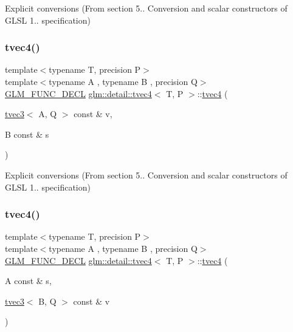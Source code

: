 Explicit conversions (From section 5.. Conversion and scalar constructors of G\+L\+SL 1.. specification) 

\mbox{\label{structglm_1_1detail_1_1tvec4_a3cfd3a19a14623991a562e5834cc6d1f}} 
\subsubsection{\texorpdfstring{tvec4()}{tvec4()}\hspace{0.1cm}{\footnotesize\ttfamily [11/23]}}
{\footnotesize\ttfamily template$<$typename T, precision P$>$ \\
template$<$typename A , typename B , precision Q$>$ \\
\hyperlink{setup_8hpp_ab2d052de21a70539923e9bcbf6e83a51}{G\+L\+M\+\_\+\+F\+U\+N\+C\+\_\+\+D\+E\+CL} \hyperlink{structglm_1_1detail_1_1tvec4}{glm\+::detail\+::tvec4}$<$ T, P $>$\+::\hyperlink{structglm_1_1detail_1_1tvec4}{tvec4} (\begin{DoxyParamCaption}\item[{\hyperlink{structglm_1_1detail_1_1tvec3}{tvec3}$<$ A, Q $>$ const \&}]{v,  }\item[{B const \&}]{s }\end{DoxyParamCaption})\hspace{0.3cm}{\ttfamily [explicit]}}



Explicit conversions (From section 5.. Conversion and scalar constructors of G\+L\+SL 1.. specification) 

\mbox{\label{structglm_1_1detail_1_1tvec4_a00972125f3cbeec17aaf42cacae4e73e}} 
\subsubsection{\texorpdfstring{tvec4()}{tvec4()}\hspace{0.1cm}{\footnotesize\ttfamily [12/23]}}
{\footnotesize\ttfamily template$<$typename T, precision P$>$ \\
template$<$typename A , typename B , precision Q$>$ \\
\hyperlink{setup_8hpp_ab2d052de21a70539923e9bcbf6e83a51}{G\+L\+M\+\_\+\+F\+U\+N\+C\+\_\+\+D\+E\+CL} \hyperlink{structglm_1_1detail_1_1tvec4}{glm\+::detail\+::tvec4}$<$ T, P $>$\+::\hyperlink{structglm_1_1detail_1_1tvec4}{tvec4} (\begin{DoxyParamCaption}\item[{A const \&}]{s,  }\item[{\hyperlink{structglm_1_1detail_1_1tvec3}{tvec3}$<$ B, Q $>$ const \&}]{v }\end{DoxyParamCaption})\hspace{0.3cm}{\ttfamily [explicit]}}



